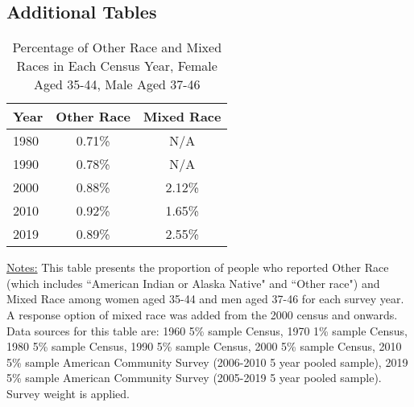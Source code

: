 \subsection{Additional Tables}



\begin{table}[H] \caption{Percentage of Other Race and Mixed Races in Each Census Year, Female Aged 35-44, Male Aged 37-46} \label{apptab:otherrace}
\begin{tabular}{lcc}
	\toprule
	Year & Other Race & Mixed Race \\ \midrule 
	1980 & 0.71\% & N/A \\
1990 & 0.78\% & N/A 	\\
2000 & 0.88\% & 2.12\%  \\
2010 & 0.92\% & 1.65\%  \\
2019 & 0.89\% & 2.55\%  \\ \bottomrule 
\end{tabular}
\begin{center}
\begin{minipage}{17cm}
\begin{spacing}{0.9}
{\footnotesize{\underline{Notes:} This table presents the proportion of people who reported Other Race (which includes ``American Indian or Alaska Native" and ``Other race") and Mixed Race among women aged 35-44 and men aged 37-46 for each survey year. A response option of mixed race was added from the 2000 census and onwards. Data sources for this table are: 1960 5\% sample Census, 1970 1\% sample Census, 1980 5\% sample Census, 1990 5\% sample Census, 2000 5\% sample Census, 2010 5\% sample American Community Survey (2006-2010 5 year pooled sample), 2019 5\% sample American Community Survey (2005-2019 5 year pooled sample). Survey weight is applied.}}
\end{spacing}
\end{minipage}
\end{center}
\end{table}


